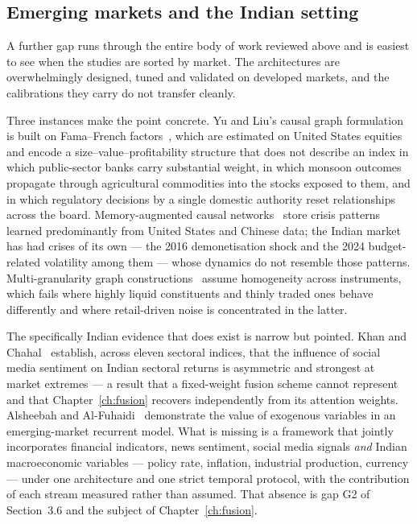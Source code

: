 \subsection{Emerging markets and the Indian setting}

A further gap runs through the entire body of work reviewed above and is easiest to see when the
studies are sorted by market. The architectures are overwhelmingly designed, tuned and validated
on developed markets, and the calibrations they carry do not transfer cleanly.

Three instances make the point concrete. Yu and Liu's causal graph formulation~\cite{yu2025causalseqgnn}
is built on Fama--French factors~\cite{famafrench1993}, which are estimated on United States
equities and encode a size--value--profitability structure that does not describe an index in
which public-sector banks carry substantial weight, in which monsoon outcomes propagate through
agricultural commodities into the stocks exposed to them, and in which regulatory decisions by a
single domestic authority reset relationships across the board. Memory-augmented causal
networks~\cite{luo2025magicnet} store crisis patterns learned predominantly from United States
and Chinese data; the Indian market has had crises of its own --- the 2016 demonetisation shock
and the 2024 budget-related volatility among them --- whose dynamics do not resemble those
patterns. Multi-granularity graph constructions~\cite{zhu2025multigran} assume homogeneity across
instruments, which fails where highly liquid constituents and thinly traded ones behave
differently and where retail-driven noise is concentrated in the latter.

The specifically Indian evidence that does exist is narrow but pointed. Khan and
Chahal~\cite{khan2025asymmetric} establish, across eleven sectoral indices, that the influence of
social media sentiment on Indian sectoral returns is asymmetric and strongest at market extremes
--- a result that a fixed-weight fusion scheme cannot represent and that
Chapter~\ref{ch:fusion} recovers independently from its attention weights. Alsheebah and
Al-Fuhaidi~\cite{alsheebah2024} demonstrate the value of exogenous variables in an emerging-market
recurrent model. What is missing is a framework that jointly incorporates financial indicators,
news sentiment, social media signals \emph{and} Indian macroeconomic variables --- policy rate,
inflation, industrial production, currency --- under one architecture and one strict temporal
protocol, with the contribution of each stream measured rather than assumed. That absence is gap
G2 of Section~3.6 and the subject of Chapter~\ref{ch:fusion}.

